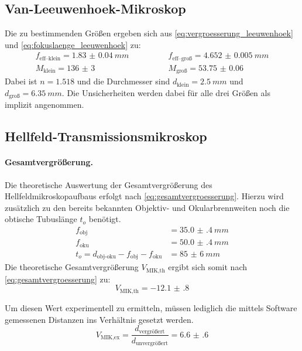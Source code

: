 \documentclass[ngerman]{scrartcl}
\begin{document}
\subsection{Van-Leeuwenhoek-Mikroskop}
\label{subsec:auswertung_Leeuwenhoek}

Die zu bestimmenden Größen ergeben sich aus \autoref{eq:vergroesserung_leeuwenhoek} und \autoref{eq:fokuslaenge_leeuwenhoek} zu:
%
\begin{align*}
    f_{\text{eff--klein}} = \SI{1.83(4)}{mm} \qquad & \qquad f_{\text{eff--groß}} = \SI{4.652(5)}{mm} \\
    M_\text{klein} = \num{136(3)} \qquad            & \qquad M_\text{groß} = \num{53.75(6)}
\end{align*}
%
Dabei ist $n = \num{1.518}$ und die Durchmesser sind $d_\text{klein} = \SI{2.5}{mm}$ und $d_\text{groß} = \SI{6.35}{mm}$. Die Unsicherheiten werden dabei für alle drei Größen als implizit angenommen.


\subsection{Hellfeld-Transmissionsmikroskop}
\label{subsec:auswertung_hellfeld}

\paragraph{Gesamtvergrößerung.}
Die theoretische Auswertung der Gesamtvergrößerung des Hellfeldmikroskopaufbaus erfolgt nach \autoref{eq:gesamtvergroesserung}. Hierzu wird zusätzlich zu den bereits bekannten Objektiv- und Okularbrennweiten noch die obtische Tubuslänge $t_o$ benötigt.
\begin{align*}
    f_\text{obj}                                   & = \SI{35.0(4)}{mm} \\
    f_\text{oku}                                   & = \SI{50.0(4)}{mm} \\
    t_o=d_\text{obj-oku}-f_\text{obj}-f_\text{oku} & = \SI{85(6)}{mm}
\end{align*}
%
Die theoretische Gesamtvergrößerung $V_\text{MIK,th}$ ergibt sich somit nach \autoref{eq:gesamtvergroesserung} zu:
\[V_\text{MIK,th} = \num{-12.1(8)}\]

Um diesen Wert experimentell zu ermitteln, müssen lediglich die mittels Software gemessenen Distanzen ins Verhältnis gesetzt werden.
\[V_\text{MIK,ex}=\frac{d_\text{vergrößert}}{d_\text{unvergrößert}}=\num{6.6(6)}\]
\end{document}
